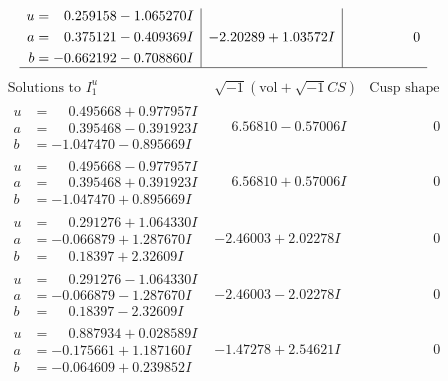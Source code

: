 \documentclass[1p]{elsarticle_modified}
\theoremstyle{definition}
\newcommand{\I}{\sqrt{-1}}
\begin{document}
$$\begin{array}{c|c|c}
\begin{aligned}
u &= \phantom{-}0.259158 - 1.065270 I \\
a &= \phantom{-}0.375121 - 0.409369 I \\
b &= -0.662192 - 0.708860 I\end{aligned}
 & -2.20289 + 1.03572 I & \phantom{-0.000000 } 0\\
 \hline 
 \end{array}$$\newpage$$\begin{array}{c|c|c}  
\text{Solutions to }I^u_{1}& \I (\text{vol} + \sqrt{-1}CS) & \text{Cusp shape}\\
 \hline 
\begin{aligned}
u &= \phantom{-}0.495668 + 0.977957 I \\
a &= \phantom{-}0.395468 - 0.391923 I \\
b &= -1.047470 - 0.895669 I\end{aligned}
 & \phantom{-}6.56810 - 0.57006 I & \phantom{-0.000000 } 0 \\ \hline\begin{aligned}
u &= \phantom{-}0.495668 - 0.977957 I \\
a &= \phantom{-}0.395468 + 0.391923 I \\
b &= -1.047470 + 0.895669 I\end{aligned}
 & \phantom{-}6.56810 + 0.57006 I & \phantom{-0.000000 } 0 \\ \hline\begin{aligned}
u &= \phantom{-}0.291276 + 1.064330 I \\
a &= -0.066879 + 1.287670 I \\
b &= \phantom{-}0.18397 + 2.32609 I\end{aligned}
 & -2.46003 + 2.02278 I & \phantom{-0.000000 } 0 \\ \hline\begin{aligned}
u &= \phantom{-}0.291276 - 1.064330 I \\
a &= -0.066879 - 1.287670 I \\
b &= \phantom{-}0.18397 - 2.32609 I\end{aligned}
 & -2.46003 - 2.02278 I & \phantom{-0.000000 } 0 \\ \hline\begin{aligned}
u &= \phantom{-}0.887934 + 0.028589 I \\
a &= -0.175661 + 1.187160 I \\
b &= -0.064609 + 0.239852 I\end{aligned}
 & -1.47278 + 2.54621 I & \phantom{-0.000000 } 0 \\ \hline\begin{aligned}

\end{aligned}
\end{array}$$
\end{document}
